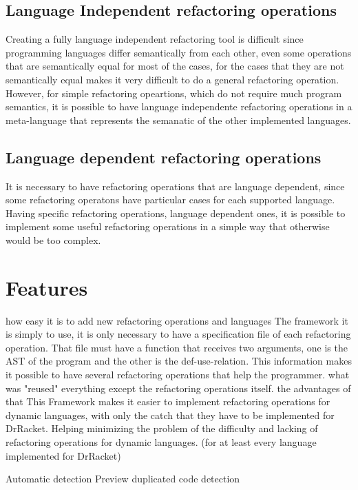 \subsection{Language Independent refactoring operations}
Creating a fully language independent refactoring tool is difficult since programming
languages differ semantically from each other, even some operations that are semantically
equal for most of the cases, for the cases that they are not semantically equal makes it very
difficult to do a general refactoring operation.
However, for simple refactoring opeartions, which do not require much program semantics,
it is possible to have language independente refactoring operations in a meta-language that
represents the semanatic of the other implemented languages. %

\subsection{Language dependent refactoring operations}
It is necessary to have refactoring operations that are language dependent, since
some refactoring operatons have particular cases for each supported language.
Having specific refactoring operations, language dependent ones, it is possible
to implement some useful refactoring operations in a simple way that otherwise would
be too complex.

\section{Features} %
how easy it is to add new refactoring operations and languages
The framework it is simply to use, it is only necessary to have a specification file
of each refactoring operation.
That file must have a function that receives two arguments,
one is the AST of the program and the other is the def-use-relation.
This information makes it possible to have several refactoring operations that help
the programmer.
what was "reused"
everything except the refactoring operations itself.
the advantages of that
This Framework makes it easier to implement refactoring operations for dynamic languages,
with only the catch that they have to be implemented for DrRacket. Helping minimizing
the problem of the difficulty and lacking of refactoring operations for dynamic languages.
(for at least every language implemented for DrRacket)

Automatic detection
Preview
duplicated code detection
